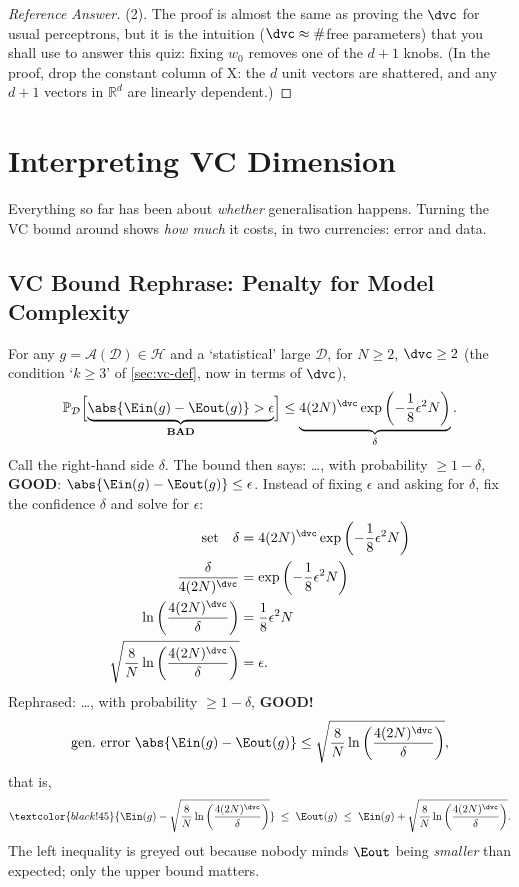\begin{proof}[Reference Answer]
    (2). The proof is almost the same as proving the \(\dvc\) for usual
    perceptrons, but it is the intuition (\(\dvc \approx \#\)free parameters)
    that you shall use to answer this quiz: fixing \(w_0\) removes one of the
    \(d + 1\) knobs. (In the proof, drop the constant column of \(\mathrm{X}\):
    the \(d\) unit vectors are shattered, and any \(d + 1\) vectors in
    \(\mathbb{R}^d\) are linearly dependent.)
\end{proof}

\section{Interpreting VC Dimension}\label{sec:vc-interpret}


Everything so far has been about \emph{whether} generalisation happens. Turning
the VC bound around shows \emph{how much} it costs, in two currencies: error
and data.

\subsection{VC Bound Rephrase: Penalty for Model Complexity}

For any \(g = \mathcal{A}(\mathcal{D}) \in \mathcal{H}\) and a `statistical'
large \(\mathcal{D}\), for \(N \ge 2\), \(\dvc \ge 2\) (the condition
`\(k \ge 3\)' of \autoref{sec:vc-def}, now in terms of \(\dvc\)),
\[
    \mathbb{P}_{\mathcal{D}}\Bigl[ \underbrace{\abs{\Ein(g) - \Eout(g)} >
    \epsilon}_{\textbf{BAD}} \Bigr]
    \le \underbrace{4 (2N)^{\dvc} \exp \left( -\frac{1}{8} \epsilon^2 N
    \right)}_{\delta} .
\]
Call the right-hand side \(\delta\). The bound then says: \dots, with
probability \(\ge 1 - \delta\), \textbf{GOOD}: \(\abs{\Ein(g) - \Eout(g)} \le
\epsilon\). Instead of fixing \(\epsilon\) and asking for \(\delta\), fix the
confidence \(\delta\) and solve for \(\epsilon\):
\begin{align*}
    \text{set} \quad \delta &= 4 (2N)^{\dvc} \exp \left( -\frac{1}{8}
    \epsilon^2 N \right)\\
    \frac{\delta}{4 (2N)^{\dvc}} &= \exp \left( -\frac{1}{8} \epsilon^2 N
    \right)\\
    \ln \left( \frac{4 (2N)^{\dvc}}{\delta} \right) &= \frac{1}{8} \epsilon^2 N\\
    \sqrt{\frac{8}{N} \ln \left( \frac{4 (2N)^{\dvc}}{\delta} \right)}
    &= \epsilon .
\end{align*}
Rephrased: \dots, with probability \(\ge 1 - \delta\), \textbf{GOOD!}
\[
    \text{gen.\ error } \abs{\Ein(g) - \Eout(g)}
    \le \sqrt{\frac{8}{N} \ln \left( \frac{4 (2N)^{\dvc}}{\delta} \right)} ,
\]
that is,
\[
    \textcolor{black!45}{\Ein(g) - \sqrt{\frac{8}{N} \ln \left(
    \frac{4 (2N)^{\dvc}}{\delta} \right)}}
    \;\le\; \Eout(g) \;\le\;
    \Ein(g) + \sqrt{\frac{8}{N} \ln \left( \frac{4 (2N)^{\dvc}}{\delta}
    \right)} .
\]
The left inequality is greyed out because nobody minds \(\Eout\) being
\emph{smaller} than expected; only the upper bound matters.

